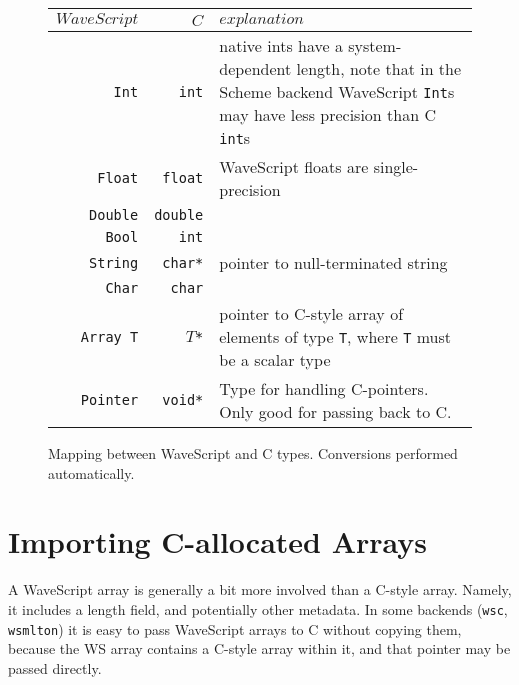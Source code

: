 \begin{figure}
\begin{center}
\begin{tabular}{|r|r|l|}
\hline
$WaveScript$ & $C$ & $explanation$\\
\hline
{\tt Int}   & {\tt int}   & 
  \parbox[t]{2.2in}{native ints have a system-dependent 
length, note that in the Scheme backend WaveScript {\tt Int}s may 
have less precision than C {\tt int}s} \\

{\tt Float} & {\tt float} & 
\parbox[t]{2.2in}{WaveScript floats are single-precision}\\

{\tt Double} & {\tt double} & \\

{\tt Bool} &   {\tt int} & \\

{\tt String} & {\tt char*} & pointer to null-terminated string \\


{\tt Char} & {\tt char} &  \\

{\tt Array T} & {\tt $T$*} & \parbox[t]{2.2in}{
pointer to C-style array of elements of type {\tt T}, where {\tt T}
must be a scalar type
}\\

{\tt Pointer} & {\tt void*} &  \parbox[t]{2.2in}{
 Type for handling C-pointers.  Only good for
  passing back to C.
}\\

\hline
\end{tabular}
\end{center}
\caption{Mapping between WaveScript and C types.  Conversions
  performed automatically.}
\label{f:types}
\end{figure}



\section{Importing C-allocated Arrays}

A WaveScript array is generally a bit more involved than a C-style
array.  Namely, it includes a length field, and potentially other
metadata.  In some backends ({\tt wsc}, {\tt wsmlton}) it is easy to
pass WaveScript arrays to C without copying them, because the WS array
contains a C-style array within it, and that pointer may be passed
directly.

